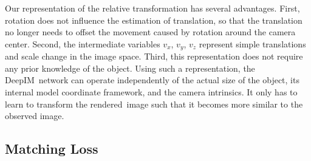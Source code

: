 \documentclass[twocolumn]{svjour3}
\newcommand{\dimnet}[0]{DeepIM}
\newcommand{\rend}[0]{rendered}
\begin{document}

Our representation of the relative transformation has several advantages. First, rotation does not influence the estimation of translation, so that the translation no longer needs to offset the movement caused by rotation around the camera center. Second, the intermediate variables $v_x$, $v_y$, $v_z$ represent simple translations and scale change in the image space. Third, this representation does not require any prior knowledge of the object. Using such a representation, the \dimnet\ network  can operate independently of the actual size of the object, its internal model coordinate framework, and the camera intrinsics. It only has to learn to transform the \rend\ image such that it becomes more similar to the observed image.


\subsection{Matching Loss}
\label{sec.points_matching_loss}
\end{document}
